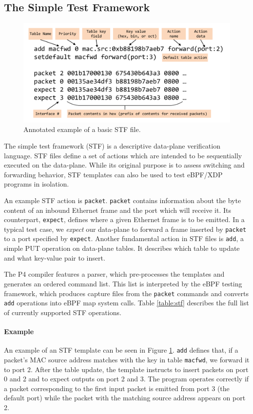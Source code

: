 \subsection{The Simple Test Framework}
\begin{figure}
	\centering
	\includegraphics[width=\linewidth]{stf}
	\caption{Annotated example of a basic STF file.}
	\label{fig:stf}
\end{figure}
The simple test framework (STF) is a descriptive data-plane verification 
language. STF files define a set of actions which are intended to be 
sequentially executed on the data-plane.
While its original purpose is to assess switching and forwarding behavior, STF 
templates can also be used to test eBPF/XDP programs in isolation. 

An example STF action is \texttt{packet}. \texttt{packet} contains information 
about the byte content of an inbound Ethernet frame and the port which will 
receive it. Its counterpart, \texttt{expect}, defines where a given Ethernet 
frame is to be emitted. In a typical test case, we \textit{expect} our 
data-plane to forward a frame inserted by \texttt{packet} to a port specified 
by \texttt{expect}.
Another fundamental action in STF files is \texttt{add}, a simple PUT operation 
on data-plane tables. It describes which table to update and what key-value 
pair to insert.

The P4 compiler features a parser, which pre-processes the templates and 
generates an ordered command list. This list is interpreted by the eBPF testing 
framework, which produces capture files from the \texttt{packet} commands and 
converts \texttt{add} operations into eBPF map system calls.
Table \ref{table:stf} describes the full list of currently 
supported STF operations.

\paragraph{Example}
An example of an STF template can be seen in Figure \ref{fig:stf}. \texttt{add} 
defines that, if a packet's MAC source address matches with the 
key in table \texttt{macfwd}, we forward it to port 2. After the table update, 
the template instructs to insert packets on port 0 and 2 and to expect outputs 
on port 2 and 3.
The program operates correctly if a packet corresponding to the first input 
packet is emitted from port 3 (the default port) while the packet with the 
matching source address appears on port 2.

